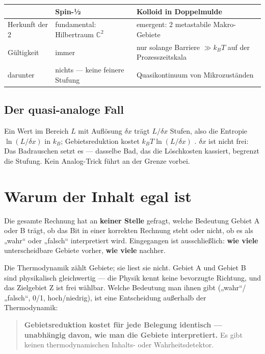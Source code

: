 \begin{center}
\small
\begin{tabular}{@{}p{}p{}p{}@{}}
\toprule
 & \textbf{Spin-½} & \textbf{Kolloid in Doppelmulde} \\
\midrule
Herkunft der 2 & fundamental: Hilbertraum $\mathbb{C}^2$ & emergent: 2 metastabile Makro-Gebiete \\
Gültigkeit & immer & nur solange Barriere $\gg k_B T$ auf der Prozesszeitskala \\
darunter & nichts --- keine feinere Stufung & Quasikontinuum von Mikrozuständen \\
\bottomrule
\end{tabular}
\end{center}

\subsection{Der quasi-analoge Fall}

Ein Wert im Bereich $L$ mit Auflösung $\delta x$ trägt $L/\delta x$ Stufen, also die Entropie $\ln(L/\delta x)$ in $k_B$;
Gebietsreduktion kostet $k_B T \ln(L/\delta x)$ . $\delta x$ ist
nicht frei: Das Badrauschen setzt es --- dasselbe Bad, das die Löschkosten
kassiert, begrenzt die Stufung. Kein Analog-Trick führt an der Grenze vorbei.

\section{Warum der Inhalt egal ist}
\label{sec:inhalt}

Die gesamte Rechnung hat an \textbf{keiner Stelle} gefragt, welche Bedeutung
Gebiet A oder B trägt, ob das Bit in einer korrekten Rechnung steht oder nicht, ob
es als „wahr“ oder „falsch“ interpretiert wird. Eingegangen ist ausschließlich:
\textbf{wie viele} unterscheidbare Gebiete vorher, \textbf{wie viele} nachher.

Die Thermodynamik zählt Gebiete; sie liest sie nicht. Gebiet A und Gebiet B sind
physikalisch gleichwertig --- die Physik kennt keine bevorzugte Richtung, und das
Zielgebiet Z ist frei wählbar. Welche Bedeutung man ihnen gibt („wahr“/„falsch“,
0/1, hoch/niedrig), ist eine Entscheidung außerhalb der Thermodynamik:

\begin{quote}
\LB \textbf{Gebietsreduktion kostet für jede Belegung identisch --- unabhängig
davon, wie man die Gebiete interpretiert.} Es gibt keinen thermodynamischen
Inhalts- oder Wahrheitsdetektor.
\end{quote}


